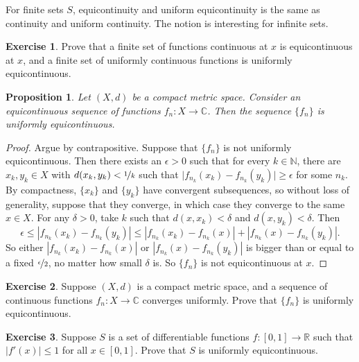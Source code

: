 \documentclass[12pt,openany]{book}
\newcommand{\sabs}[1]{\lvert {#1} \rvert}
\newcommand{\abs}[1]{\left\lvert {#1} \right\rvert}
\newcommand{\C}{{\mathbb{C}}}
\newcommand{\R}{{\mathbb{R}}}
\newcommand{\N}{{\mathbb{N}}}
\theoremstyle{plain}
\newtheorem{prop}[thm]{Proposition}
\theoremstyle{remark}
\theoremstyle{definition}
\newenvironment{exbox}{%
    \def\FrameCommand{\vrule width 1pt \relax\hspace{10pt}}%
    \MakeFramed{\advance\hsize-\width\FrameRestore}%
}{%
    \endMakeFramed
}
\theoremstyle{exercise}
\newtheorem{exercise}{Exercise}[section]
\theoremstyle{example}
\begin{document}
For finite sets $S$, equicontinuity and uniform equicontinuity
is the same as continuity and uniform continuity.
The notion is interesting for infinite sets.

\begin{exbox}
\begin{exercise}
Prove that a finite set of functions continuous at $x$ is
equicontinuous at $x$, and
a finite set of uniformly continuous functions is uniformly equicontinuous.
\end{exercise}
\end{exbox}

\begin{prop}
Let $(X,d)$ be a compact metric space.
Consider an
equicontinuous sequence of functions
$f_n \colon X \to \C$.
Then the sequence $\{ f_n \}$ is uniformly equicontinuous.
\end{prop}

\begin{proof}
Argue by contrapositive.  Suppose that $\{ f_n \}$ is not
uniformly equicontinuous.  Then there exists an $\epsilon > 0$
such that for every $k \in \N$, there
are $x_k,y_k \in X$ with $d(x_k,y_k) < \nicefrac{1}{k}$
such that $\sabs{f_{n_k}(x_k)-f_{n_k}(y_k)} \geq \epsilon$ for some $n_k$.
By compactness, $\{x_k\}$ and $\{ y_k\}$ have convergent subsequences, so
without loss of generality, suppose that they converge, in which case
they converge to the same $x \in X$.
For any $\delta > 0$, take $k$ such that
$d(x,x_k) < \delta$ and
$d(x,y_k) < \delta$.
Then
\begin{equation*}
\epsilon \leq 
\abs{f_{n_k}(x_k)-f_{n_k}(y_k)}
\leq
\abs{f_{n_k}(x_k)-f_{n_k}(x)} + \abs{f_{n_k}(x)-f_{n_k}(y_k)} .
\end{equation*}
So either 
$\abs{f_{n_k}(x_k)-f_{n_k}(x)}$ or $\abs{f_{n_k}(x)-f_{n_k}(y_k)}$ is
bigger than or equal to a fixed $\nicefrac{\epsilon}{2}$,
no matter how small $\delta$ is.
So $\{ f_n \}$ is not equicontinuous at $x$.
\end{proof}

\begin{exbox}
\begin{exercise}
Suppose $(X,d)$ is a compact metric space,
and a sequence of continuous functions $f_n \colon X \to \C$
converges uniformly. Prove that $\{ f_n \}$ is uniformly equicontinuous.
\end{exercise}

\begin{exercise}
Suppose $S$ is a set of differentiable functions $f \colon [0,1] \to \R$
such that $\sabs{f'(x)} \leq 1$ for all $x \in [0,1]$.
Prove that $S$ is uniformly equicontinuous.
\end{exercise}
\end{exbox}
\end{document}
